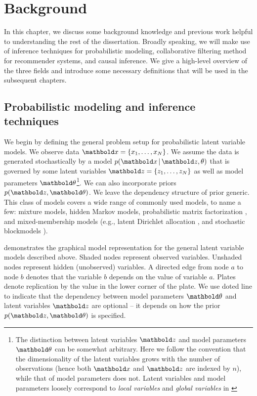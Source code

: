 

\chapter{Background}\label{chpt:background}

In this chapter, we discuss some background knowledge and previous work helpful to understanding the rest of the dissertation. 
Broadly speaking, we will make use of inference techniques for probabilistic modeling, collaborative filtering method for recommender systems, and causal inference. We give a high-level overview of the three fields and introduce some necessary definitions that will be used in the subsequent chapters. 

\section{Probabilistic modeling and inference techniques}\label{chpt:background:sec:inference}

We begin by defining the general problem setup for probabilistic latent variable models. We observe data $\mbx = \{x_1, \dots, x_N\}$. We assume the data is generated stochastically by a model $p(\mbx \g \mbz, \theta)$ that is governed by some latent variables $\mbz = \{z_1, \dots, z_N\}$ as well as model parameters $\mb\theta$\footnote{The distinction between latent variables $\mbz$ and model parameters $\mb\theta$ can be somewhat arbitrary. Here we follow the convention that the dimensionality of the latent variables grows with the number of observations (hence both $\mbx$ and $\mbz$ are indexed by $n$), while that of model parameters does not. Latent variables and model parameters loosely correspond to \textit{local variables} and \textit{global variables} in \citet{hoffman2013stochastic}}. We can also incorporate priors $p(\mbz, \mb\theta)$. We leave the dependency structure of prior generic. This class of models covers a wide range of commonly used models, to name a few: mixture models, hidden Markov models, probabilistic matrix factorization \citep{salakhutdinov2008probabilistic}, and mixed-membership models (e.g., latent Dirichlet allocation \citep{blei2003latent}, and stochastic blockmodels \citep{DBLP:journals/jmlr/AiroldiBFX08}).

 demonstrates the graphical model representation for the general latent variable models described above. Shaded nodes represent observed variables. Unshaded nodes represent
hidden (unobserved) variables. A directed edge from node $a$ to node $b$
denotes that the variable $b$ depends on the value of variable
$a$. Plates denote replication by the value in the lower corner
of the plate. We use doted line to indicate that the dependency between model parameters $\mb\theta$ and latent variables $\mbz$ are optional -- it depends on how the prior $p(\mbz, \mb\theta)$ is specified. 

